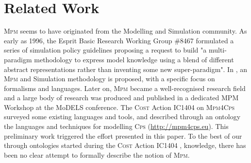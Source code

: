 \section{Related Work}
\label{sec:RelatedWork}

\textsc{Mpm} seems to have originated from the Modelling and 
Simulation community. As early as 1996, the Esprit Basic 
Research Working Group \#8467 formulated a series of simulation policy 
guidelines \cite{Vangheluwe-VansteenkisteKerckhoffs-1996} proposing a request 
to build "a multi-paradigm methodology to express model knowledge using a blend 
of different abstract representations rather than inventing some new 
super-paradigm". In \cite{Vangheluwe-Vansteenkiste1996}, an \textsc{Mpm} and 
Simulation methodology is proposed, with a specific focus on formalisms and 
languages. Later on, \textsc{Mpm} became a well-recognised research field and a 
large body of research was produced and published in a dedicated MPM Workshop 
at the MoDELS conference. The \textsc{Cost} Action IC1404 on \textsc{Mpm4Cps} 
surveyed some existing languages and tools, and described through an ontology 
the languages and techniques for modelling \textsc{Cps} 
(\url{http://mpm4cps.eu}). This 
preliminary work triggered the effort presented in this paper. To the best of 
our through ontologies started during the \textsc{Cost} Action IC1404 \cite{}, 
knowledge, there has been no clear attempt to formally describe the notion of 
\textsc{Mpm}.
